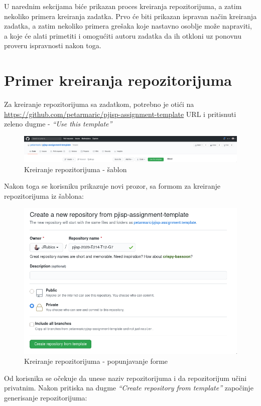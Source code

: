 \documentclass[12pt]{report}
\begin{document}
U narednim sekcijama biće prikazan proces kreiranja repozitorijuma, a zatim nekoliko primera kreiranja zadatka. Prvo će biti prikazan ispravan način kreiranja zadatka, a zatim nekoliko primera grešaka koje nastavno osoblje može napraviti, a koje će alati primetiti i omogućiti autoru zadatka da ih otkloni uz ponovnu proveru ispravnosti nakon toga.

\section{Primer kreiranja repozitorijuma}

Za kreiranje repozitorijuma sa zadatkom, potrebno je otići na \url{https://github.com/petarmaric/pjisp-assignment-template} URL i pritisnuti zeleno dugme - \textit{``Use this template''}


\begin{figure}[H]
    \centering
    \includegraphics[width=\linewidth]{images/1.png}
    \caption{Kreiranje repozitorijuma - šablon}
\end{figure}

Nakon toga se korisniku prikazuje novi prozor, sa formom za kreiranje repozitorijuma iz šablona:

\begin{figure}[H]
    \centering
    \includegraphics[width=0.7\linewidth]{images/2.png}
    \caption{Kreiranje repozitorijuma - popunjavanje forme}
\end{figure}

Od korisnika se očekuje da unese naziv repozitorijuma i da repozitorijum učini privatnim. Nakon pritiska na dugme \textit{``Create repository from template''} započinje generisanje repozitorijuma:
\end{document}
